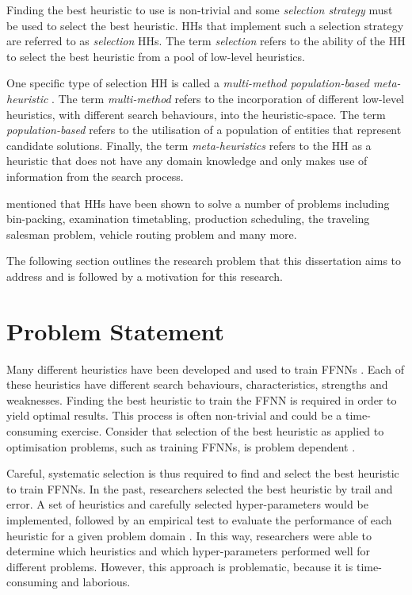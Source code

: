Finding the best heuristic to use is non-trivial and some \textit{selection strategy} must be used to select the best heuristic. \acp{HH} that implement such a selection strategy are referred to as \textit{selection} \acp{HH}. The term \textit{selection} refers to the ability of the \ac{HH} to select the best heuristic from a pool of low-level heuristics.

One specific type of selection \ac{HH} is called a \textit{multi-method population-based meta-heuristic} \cite{ref:vanderstockt:2018}. The term \textit{multi-method} refers to the incorporation of different low-level heuristics, with different search behaviours, into the heuristic-space. The term \textit{population-based} refers to the utilisation of a population of entities that represent candidate solutions. Finally, the term \textit{meta-heuristics} refers to the \ac{HH} as a heuristic that does not have any domain knowledge and only makes use of information from the search process.

\citeauthor{ref:grobler:2015} \cite{ref:grobler:2015} mentioned that \acp{HH} have been shown to solve a number of problems including bin-packing, examination timetabling, production scheduling, the traveling salesman problem, vehicle routing problem and many more.

The following section outlines the research problem that this dissertation aims to address and is followed by a motivation for this research.


\section{Problem Statement}\label{sec:introduction:problem}

Many different heuristics have been developed and used to train \acp{FFNN} \cite{ref:gudise:2003, ref:rakitianskaia:2012, ref:montana:1989}. Each of these heuristics have different search behaviours, characteristics, strengths and weaknesses. Finding the best heuristic to train the \ac{FFNN} is required in order to yield optimal results. This process is often non-trivial and could be a time-consuming exercise.  Consider that selection of the best heuristic as applied to optimisation problems, such as training \acp{FFNN}, is problem dependent \cite{ref:allen:1996, ref:drake:2020, ref:pillay:2018}.

Careful, systematic selection is thus required to find and select the best heuristic to train \acp{FFNN}. In the past, researchers selected the best heuristic by trail and error. A set of heuristics and carefully selected hyper-parameters would be implemented, followed by an empirical test to evaluate the performance of each heuristic for a given problem domain \cite{ref:pillay:2015}. In this way, researchers were able to determine which heuristics and which hyper-parameters performed well for different problems. However, this approach is problematic, because it is time-consuming and laborious.

